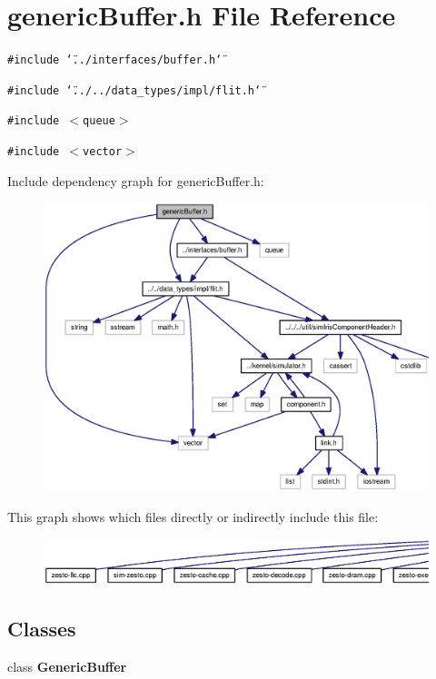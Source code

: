 \section{genericBuffer.h File Reference}
\label{genericBuffer_8h}
{\tt \#include \char`\"{}../interfaces/buffer.h\char`\"{}}\par
{\tt \#include \char`\"{}../../data\_\-types/impl/flit.h\char`\"{}}\par
{\tt \#include $<$queue$>$}\par
{\tt \#include $<$vector$>$}\par


Include dependency graph for genericBuffer.h:\nopagebreak
\begin{figure}[H]
\begin{center}
\leavevmode
\includegraphics[width=328pt]{genericBuffer_8h__incl}
\end{center}
\end{figure}


This graph shows which files directly or indirectly include this file:\nopagebreak
\begin{figure}[H]
\begin{center}
\leavevmode
\includegraphics[width=420pt]{genericBuffer_8h__dep__incl}
\end{center}
\end{figure}
\subsection*{Classes}
\begin{CompactItemize}
\item 
class {\bf GenericBuffer}
\end{CompactItemize}
